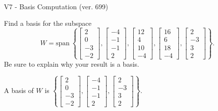 \begin{exercise}
  \begin{exerciseTitle}V7 - Basis Computation (ver. 699)\end{exerciseTitle}
  \begin{exerciseStatement}
    Find a basis for the subspace 
\[W=\mathrm{span}\ \left\{\left[\begin{array}{r}
2 \\
0 \\
-3 \\
-2
\end{array}\right] , \left[\begin{array}{r}
-4 \\
-1 \\
-1 \\
2
\end{array}\right] , \left[\begin{array}{r}
12 \\
4 \\
10 \\
-4
\end{array}\right] , \left[\begin{array}{r}
16 \\
6 \\
18 \\
-4
\end{array}\right] , \left[\begin{array}{r}
2 \\
-3 \\
3 \\
2
\end{array}\right]\right\}.\]
 Be sure to explain why your result is a basis.


  \end{exerciseStatement}
  \begin{exerciseAnswer}
   A basis of \(W\) is  \(\left\{\left[\begin{array}{r}
2 \\
0 \\
-3 \\
-2
\end{array}\right] , \left[\begin{array}{r}
-4 \\
-1 \\
-1 \\
2
\end{array}\right] , \left[\begin{array}{r}
2 \\
-3 \\
3 \\
2
\end{array}\right]\right\}\).
  


  \end{exerciseAnswer}
\end{exercise}